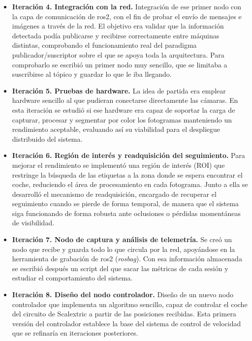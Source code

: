 \begin{itemize}
    \item \textbf{Iteración 4. Integración con la red.} Integración de ese primer nodo con la capa de comunicación de \gls{ros2}, con el fin de probar el envío de mensajes e imágenes a través de la red. El objetivo era validar que la información detectada podía publicarse y recibirse correctamente entre máquinas distintas, comprobando el funcionamiento real del paradigma publicador/suscriptor sobre el que se apoya toda la arquitectura. Para comprobarlo se escribió un primer nodo muy sencillo, que se limitaba a suscribirse al tópico y guardar lo que le iba llegando.

    \item \textbf{Iteración 5. Pruebas de hardware.} La idea de partida era emplear hardware sencillo al que pudieran conectarse directamente las cámaras. En esta iteración se estudió si ese hardware era capaz de soportar la carga de capturar, procesar y segmentar por color los fotogramas manteniendo un rendimiento aceptable, evaluando así su viabilidad para el despliegue distribuido del sistema.

    \item \textbf{Iteración 6. Región de interés y readquisición del seguimiento.} Para mejorar el rendimiento se implementó una región de interés (ROI) que restringe la búsqueda de las etiquetas a la zona donde se espera encontrar el coche, reduciendo el área de procesamiento en cada fotograma. Junto a ella se desarrolló el mecanismo de readquisición, encargado de recuperar el seguimiento cuando se pierde de forma temporal, de manera que el sistema siga funcionando de forma robusta ante oclusiones o pérdidas momentáneas de visibilidad.

    \item \textbf{Iteración 7. Nodo de captura y análisis de telemetría.} Se creó un nodo que recibe y guarda todo lo que circula por la red, apoyándose en la herramienta de grabación de \gls{ros2} (\emph{rosbag}). Con esa información almacenada se escribió después un script del que sacar las métricas de cada sesión y estudiar el comportamiento del sistema.

    \item \textbf{Iteración 8. Diseño del nodo controlador.} Diseño de un nuevo nodo controlador que implementa un algoritmo sencillo, capaz de controlar el coche del circuito de Scalextric a partir de las posiciones recibidas. Esta primera versión del controlador establece la base del sistema de control de velocidad que se refinaría en iteraciones posteriores.


\end{itemize}
